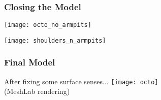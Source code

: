 \documentclass[14pt]{beamer}
\begin{document}
\begin{frame}
\frametitle{Closing the Model}


\begin{center}
\texttt{[image: octo\_no\_armpits]}
\end{center}

\vfill


\begin{center}
\texttt{[image: shoulders\_n\_armpits]}
\end{center}


\end{frame}

\begin{frame}
\frametitle{Final Model}

\begin{center}
After fixing some surface senses...
\texttt{[image: octo]} \\
(MeshLab rendering)
\end{center}

\end{frame}
\end{document}
